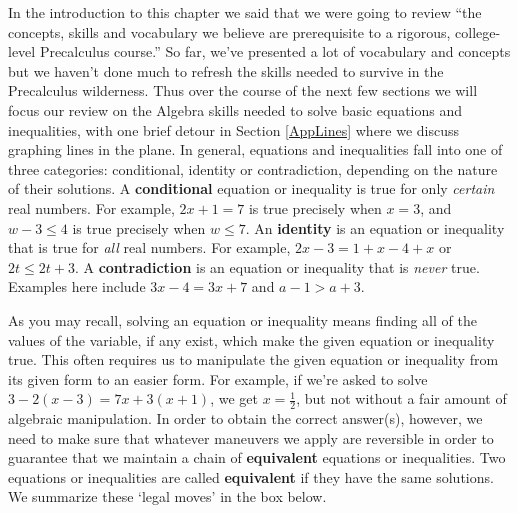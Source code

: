 \documentclass{ximera}
\begin{document}
	\author{Stitz-Zeager}




\setcounter{footnote}{0}

\label{AppLinearEqIneq}

In the introduction to this chapter we said that we were going to review ``the concepts, skills and vocabulary we believe are prerequisite to a rigorous, college-level Precalculus course.''  So far, we've presented a lot of vocabulary and concepts but we haven't done much to refresh the skills needed to survive in the Precalculus wilderness.  Thus over the course of the next few sections we will focus our review on the Algebra skills needed to solve basic equations and inequalities, with one brief detour in Section \ref{AppLines} where we discuss graphing lines in the plane.  In general, equations and inequalities fall into one of three categories:  conditional, identity or contradiction, depending on the nature of their solutions.  A \textbf{conditional} equation or inequality is true for only \textit{certain} real numbers.  For example, $2x+1 = 7$ is true precisely when $x = 3$, and $w - 3 \leq 4$ is true precisely when $w \leq 7$.  An \textbf{identity} is an equation or inequality that is true for \textit{all} real numbers.  For example, $2x -3 = 1+x-4+x$ or $2t \leq 2t + 3$.  A \textbf{contradiction} is an equation or inequality that is \textit{never} true.  Examples here include $3x - 4 = 3x + 7$ and $a - 1 > a + 3$.  

\bigskip

As you may recall, solving an equation or inequality means finding all of the values of the variable, if any exist, which make the given equation or inequality true.  This often requires us to manipulate the given equation or inequality from its given form to an easier form.  For example, if we're asked to solve $3 - 2(x-3) = 7x + 3(x+1)$, we get $x = \frac{1}{2}$, but not without a fair amount of algebraic manipulation. In order to obtain the correct answer(s), however, we need to make sure that whatever maneuvers we apply are reversible in order to guarantee that we maintain a chain of \textbf{equivalent} equations or inequalities.  Two equations or inequalities are called \textbf{equivalent} if they have the same solutions.  We summarize these `legal moves' in the box below.
\end{document}
